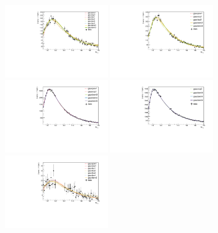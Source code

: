 \begin{figure}
	\begin{center}
        \includegraphics[width=0.4\textwidth]{fig/envelope_plots/m105_170_cat1_turn_lau.pdf}
        \includegraphics[width=0.4\textwidth]{fig/envelope_plots/m105_170_cat2_turn_lau.pdf}\\
        \includegraphics[width=0.4\textwidth]{fig/envelope_plots/m105_170_cat3_turn_bern5.pdf}
        \includegraphics[width=0.4\textwidth]{fig/envelope_plots/m105_170_cat4_turn_bern5.pdf}\\
        \includegraphics[width=0.4\textwidth]{fig/envelope_plots/m105_170_cat501_turn_lau.pdf}

\end{center}
\end{figure}
